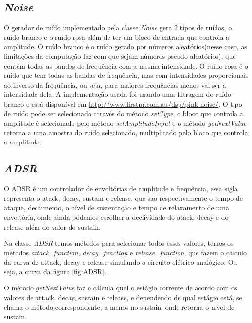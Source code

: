 \documentclass{article}
\begin{document}
\subsection{\emph{Noise}}
O gerador de ruído implementado pela classe \emph{Noise} gera 2 tipos de ruídos, o ruído branco e o ruído rosa além de ter um bloco de entrada que controla a amplitude.
O ruído branco é o ruído gerado por números aleatórios(nesse caso, as limitações da computação faz com que sejam números pseudo-aleatórios),
 que contém todas as bandas de frequência com a mesma intensidade.
O ruído rosa é o ruído que tem todas as bandas de frequência, mas com intensidades proporcionais ao inverso da frequência, ou seja, para maiores
 frequências menos vai ser a intensidade dela. A implementação usada foi usando uma filtragem do ruído branco e está disponível em \url{http://www.firstpr.com.au/dsp/pink-noise/}.
O tipo de ruído pode ser selecionado através do método \emph{setType}, o bloco que controla a amplitude é selecionado pelo método \emph{setAmplitudeInput}
e o método \emph{getNextValue} retorna a uma amostra do ruído selecionado, multiplicado pelo bloco que controla a amplitude.

\subsection{\emph{ADSR}}
O ADSR é um controlador de envoltórias de amplitude e frequência, essa sigla representa o atack, decay, sustain e release, que são 
respectivamente o tempo de ataque, decaimento, o nível de sustentação e tempo de relaxamento de uma envoltória, onde ainda podemos 
escolher a declividade do atack, decay e do release além do valor do sustain.



Na classe \emph{ADSR} temos métodos para selecionar todos esses valores, temos os métodos \emph{attack\_function}, \emph{decay\_function}
 e \emph{release\_function}, que fazem o cálculo da curva de attack, decay e release simulando o circuito elétrico analógico. Ou seja, a curva da figura \ref{fig:ADSR}.



O método \emph{getNextValue} faz o cálcula qual o estágio corrente de acordo com os valores de attack, decay, sustain e release, e dependendo de 
qual estágio está, se chama o método correspondente, a menos no sustain, onde retorna o nível de sustain.
\end{document}
